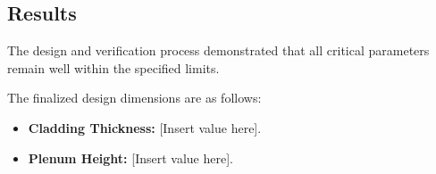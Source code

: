 \subsection{Results}

The design and verification process demonstrated that all critical parameters remain well within the specified limits.

The finalized design dimensions are as follows:
\begin{itemize}
    \item \textbf{Cladding Thickness:} [Insert value here].
    \item \textbf{Plenum Height:} [Insert value here].
\end{itemize}
